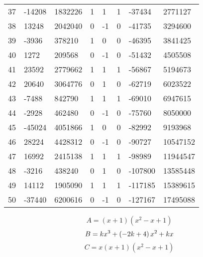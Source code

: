\documentclass{amsart}
\begin{document}
\begin{longtable}{|l|l|l|lllll|}
37&-14208&1832226&1&1&1&-37434&2771127\\
38&13248&2042040&0&-1&0&-41735&3294600\\
39&-3936&378210&1&0&0&-46395&3841425\\
40&1272&209568&0&-1&0&-51432&4505508\\
41&23592&2779662&1&1&1&-56867&5194673\\
42&20640&3064776&0&1&0&-62719&6023522\\
43&-7488&842790&1&1&1&-69010&6947615\\
44&-2928&462480&0&-1&0&-75760&8050000\\
45&-45024&4051866&1&0&0&-82992&9193968\\
46&28224&4428312&0&-1&0&-90727&10547152\\
47&16992&2415138&1&1&1&-98989&11944547\\
48&-3216&438240&0&1&0&-107800&13585448\\
49&14112&1905090&1&1&1&-117185&15389615\\
50&-37440&6200616&0&-1&0&-127167&17495088\\
\hline
\end{longtable}
$$A=(x
 + 1)(x^2
 - x
 + 1)$$
$$B=k\*x^3
 + \left(-2\*k
 + 4\right) \*x^2
 + k\*x$$
$$C=x(x
 + 1)(x^2
 - x
 + 1)$$
\end{document}
